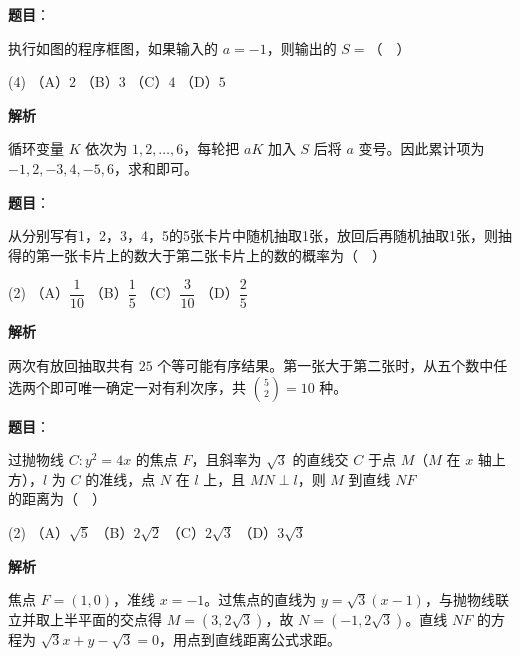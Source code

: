 \begin{answer}

\textbf{题目}：

执行如图的程序框图，如果输入的 \(a=-1\)，则输出的 \(S=\)（　）
\nopagebreak[4]
\begin{center}\end{center}
\nopagebreak[4]
\begin{gkopts}(4)
\task （A）\(2\)
\task （B）\(3\)
\task （C）\(4\)
\task （D）\(5\)
\end{gkopts}

\textbf{解析}

循环变量 \(K\) 依次为 \(1,2,\ldots,6\)，每轮把 \(aK\) 加入 \(S\) 后将 \(a\) 变号。因此累计项为 \(-1,2,-3,4,-5,6\)，求和即可。


\end{answer}
\begin{answer}

\textbf{题目}：

从分别写有1，2，3，4，5的5张卡片中随机抽取1张，放回后再随机抽取1张，则抽得的第一张卡片上的数大于第二张卡片上的数的概率为（　）

\begin{gkopts}(2)
\task （A）\(\dfrac{1}{10}\)
\task （B）\(\dfrac{1}{5}\)
\task （C）\(\dfrac{3}{10}\)
\task （D）\(\dfrac{2}{5}\)
\end{gkopts}

\textbf{解析}

两次有放回抽取共有 \(25\) 个等可能有序结果。第一张大于第二张时，从五个数中任选两个即可唯一确定一对有利次序，共 \(\binom52=10\) 种。


\end{answer}
\begin{answer}

\textbf{题目}：

过抛物线 \(C:y^2=4x\) 的焦点 \(F\)，且斜率为 \(\sqrt3\) 的直线交 \(C\) 于点 \(M\)（\(M\) 在 \(x\) 轴上方），\(l\) 为 \(C\) 的准线，点 \(N\) 在 \(l\) 上，且 \(MN\perp l\)，则 \(M\) 到直线 \(NF\) 的距离为（　）

\begin{gkopts}(2)
\task （A）\(\sqrt5\)
\task （B）\(2\sqrt2\)
\task （C）\(2\sqrt3\)
\task （D）\(3\sqrt3\)
\end{gkopts}

\textbf{解析}

焦点 \(F=(1,0)\)，准线 \(x=-1\)。过焦点的直线为 \(y=\sqrt3(x-1)\)，与抛物线联立并取上半平面的交点得 \(M=(3,2\sqrt3)\)，故 \(N=(-1,2\sqrt3)\)。直线 \(NF\) 的方程为 \(\sqrt3x+y-\sqrt3=0\)，用点到直线距离公式求距。


\end{answer}

